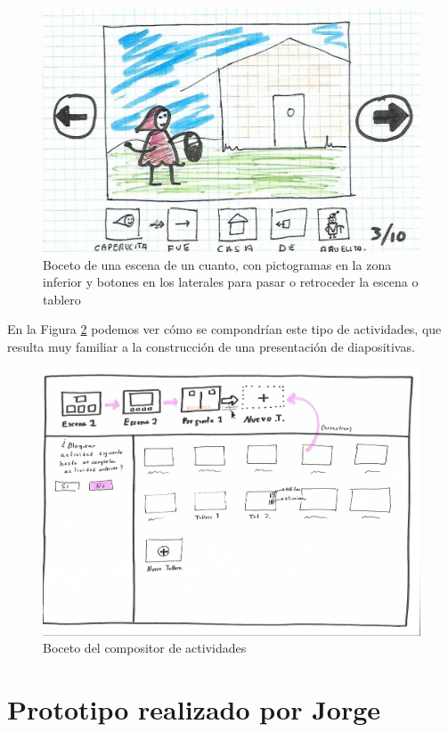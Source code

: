 \begin{figure}[h!]
	\centering
	\includegraphics[width=0.7\linewidth]{Imagenes/Bitmap/Cuento}
	\caption{Boceto de una escena de un cuanto, con pictogramas en la zona inferior y botones en los laterales para pasar o retroceder la escena o tablero}
	\label{fig:cuento}
\end{figure}


En la Figura \ref{fig:presentaciontableros} podemos ver cómo se compondrían este tipo de actividades, que resulta muy familiar a la construcción de una presentación de diapositivas.  

\begin{figure}[h!]
	\centering
	\includegraphics[width=0.7\linewidth]{Imagenes/Bitmap/presentacionTableros}
	\caption{Boceto del compositor de actividades}
	\label{fig:presentaciontableros}
\end{figure}


\section*{Prototipo realizado por Jorge}

